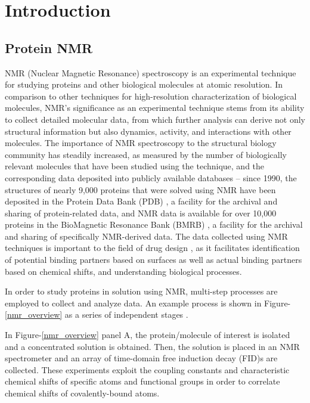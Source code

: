 \chapter{Introduction}

\section{Protein NMR}
NMR (Nuclear Magnetic Resonance) spectroscopy is an experimental technique for 
studying proteins and other biological molecules at atomic resolution.  In 
comparison to other techniques for high-resolution characterization of 
biological molecules, NMR's significance as an experimental technique stems 
from its ability to collect detailed molecular data, from which further 
analysis can derive not only structural information but also dynamics, 
activity, and interactions with other molecules.  The importance of NMR 
spectroscopy to the structural biology community has steadily increased, as 
measured by the number of biologically relevant molecules that have been 
studied using the technique, and the corresponding data deposited into 
publicly available databases -- since 1990, the structures of nearly 9,000 
proteins that were solved using NMR have been deposited in the Protein Data 
Bank (PDB) \cite{pdb}, a facility for the archival and sharing of protein-related 
data, and NMR data is available for over 10,000 proteins in the BioMagnetic 
Resonance Bank (BMRB) \cite{bmrb}, a facility for the archival and sharing of 
specifically NMR-derived data.  The data collected using NMR techniques is 
important to the field of drug design 
\cite{stockman2002drugs, moore2003leveraging, reckel2011proteorhodopsin}, 
as it facilitates identification of potential 
binding partners based on surfaces as well as actual binding partners based on 
chemical shifts, and understanding biological processes.

In order to study proteins in solution using NMR, multi-step processes are 
employed to collect and analyze data.  An example process is shown in 
Figure-\ref{nmr_overview} as a series of independent stages 
\cite{guerry2011automated}.

In Figure-\ref{nmr_overview} panel A, 
the protein/molecule of interest is isolated and a concentrated solution 
is obtained.  Then, the solution is placed in an NMR spectrometer and an array 
of time-domain free induction decay (FID)s are collected.  These experiments 
exploit the coupling constants and characteristic chemical shifts of specific 
atoms and functional groups in order to correlate chemical shifts of 
covalently-bound atoms.

